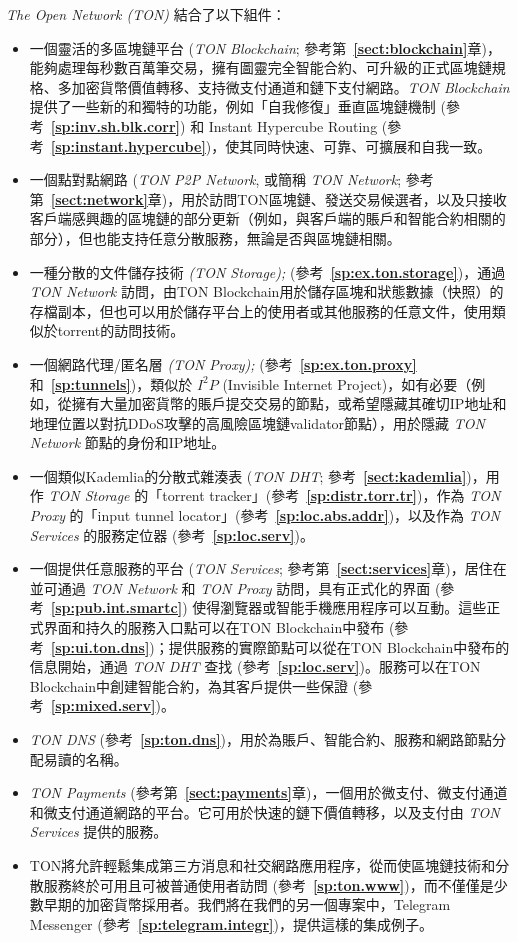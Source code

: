 \documentclass[12pt,oneside]{article}
\def\refpoint#1{{\rm\textbf{\ref{#1}}}}
\let\ptref=\refpoint
\begin{document}
{\em The Open Network (TON)} 結合了以下組件：
\begin{itemize}
\item 一個靈活的多區塊鏈平台 ({\em TON Blockchain}; 參考第~\ptref{sect:blockchain}章)，能夠處理每秒數百萬筆交易，擁有圖靈完全智能合約、可升級的正式區塊鏈規格、多加密貨幣價值轉移、支持微支付通道和鏈下支付網路。{\em TON Blockchain\/} 提供了一些新的和獨特的功能，例如「自我修復」垂直區塊鏈機制 (參考~\ptref{sp:inv.sh.blk.corr}) 和 Instant Hypercube Routing (參考~\ptref{sp:instant.hypercube})，使其同時快速、可靠、可擴展和自我一致。
\item 一個點對點網路 ({\em TON P2P Network}, 或簡稱 {\em TON Network}; 參考第~\ptref{sect:network}章)，用於訪問TON區塊鏈、發送交易候選者，以及只接收客戶端感興趣的區塊鏈的部分更新（例如，與客戶端的賬戶和智能合約相關的部分），但也能支持任意分散服務，無論是否與區塊鏈相關。
\item 一種分散的文件儲存技術 {\em (TON Storage);} (參考~\ptref{sp:ex.ton.storage})，通過 {\em TON Network} 訪問，由TON Blockchain用於儲存區塊和狀態數據（快照）的存檔副本，但也可以用於儲存平台上的使用者或其他服務的任意文件，使用類似於torrent的訪問技術。
\item 一個網路代理/匿名層 {\em (TON Proxy);} (參考~\ptref{sp:ex.ton.proxy} 和~\ptref{sp:tunnels})，類似於 $I^2P$ (Invisible Internet Project)，如有必要（例如，從擁有大量加密貨幣的賬戶提交交易的節點，或希望隱藏其確切IP地址和地理位置以對抗DDoS攻擊的高風險區塊鏈validator節點），用於隱藏 {\em TON Network\/} 節點的身份和IP地址。
\item 一個類似Kademlia的分散式雜湊表 ({\em TON DHT}; 參考~\ptref{sect:kademlia})，用作 {\em TON Storage} 的「torrent tracker」(參考~\ptref{sp:distr.torr.tr})，作為 {\em TON Proxy\/} 的「input tunnel locator」(參考~\ptref{sp:loc.abs.addr})，以及作為 {\em TON Services} 的服務定位器 (參考~\ptref{sp:loc.serv})。
\item 一個提供任意服務的平台 ({\em TON Services}; 參考第~\ptref{sect:services}章)，居住在並可通過 {\em TON Network\/} 和 {\em TON Proxy} 訪問，具有正式化的界面 (參考~\ptref{sp:pub.int.smartc}) 使得瀏覽器或智能手機應用程序可以互動。這些正式界面和持久的服務入口點可以在TON Blockchain中發布 (參考~\ptref{sp:ui.ton.dns})；提供服務的實際節點可以從在TON Blockchain中發布的信息開始，通過 {\em TON DHT\/} 查找 (參考~\ptref{sp:loc.serv})。服務可以在TON Blockchain中創建智能合約，為其客戶提供一些保證 (參考~\ptref{sp:mixed.serv})。
\item {\em TON DNS\/} (參考~\ptref{sp:ton.dns})，用於為賬戶、智能合約、服務和網路節點分配易讀的名稱。
\item {\em TON Payments\/} (參考第~\ptref{sect:payments}章)，一個用於微支付、微支付通道和微支付通道網路的平台。它可用於快速的鏈下價值轉移，以及支付由 {\em TON Services} 提供的服務。
\item TON將允許輕鬆集成第三方消息和社交網路應用程序，從而使區塊鏈技術和分散服務終於可用且可被普通使用者訪問 (參考~\ptref{sp:ton.www})，而不僅僅是少數早期的加密貨幣採用者。我們將在我們的另一個專案中，Telegram Messenger (參考~\ptref{sp:telegram.integr})，提供這樣的集成例子。
\end{itemize}
\end{document}
